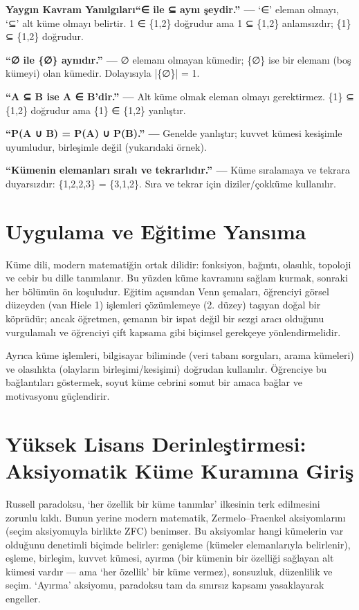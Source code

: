 \begin{tcolorbox}[bookbox,colback=cMis]\textbf{\textsf{\textcolor{cAcc}{Yaygın Kavram Yanılgıları}}}\quad \textbf{“∈ ile ⊆ aynı şeydir.” — }‘∈’ eleman olmayı, ‘⊆’ alt küme olmayı belirtir. 1 ∈ \{1,2\} doğrudur ama 1 ⊆ \{1,2\} anlamsızdır; \{1\} ⊆ \{1,2\} doğrudur.\par\medskip{}\textbf{“∅ ile \{∅\} aynıdır.” — }∅ elemanı olmayan kümedir; \{∅\} ise bir elemanı (boş kümeyi) olan kümedir. Dolayısıyla |\{∅\}| = 1.\par\medskip{}\textbf{“A ⊆ B ise A ∈ B’dir.” — }Alt küme olmak eleman olmayı gerektirmez. \{1\} ⊆ \{1,2\} doğrudur ama \{1\} ∈ \{1,2\} yanlıştır.\par\medskip{}\textbf{“P(A ∪ B) = P(A) ∪ P(B).” — }Genelde yanlıştır; kuvvet kümesi kesişimle uyumludur, birleşimle değil (yukarıdaki örnek).\par\medskip{}\textbf{“Kümenin elemanları sıralı ve tekrarlıdır.” — }Küme sıralamaya ve tekrara duyarsızdır: \{1,2,2,3\} = \{3,1,2\}. Sıra ve tekrar için diziler/çokküme kullanılır.\end{tcolorbox}

\section{Uygulama ve Eğitime Yansıma}

Küme dili, modern matematiğin ortak dilidir: fonksiyon, bağıntı, olasılık, topoloji ve cebir bu dille tanımlanır. Bu yüzden küme kavramını sağlam kurmak, sonraki her bölümün ön koşuludur. Eğitim açısından Venn şemaları, öğrenciyi görsel düzeyden (van Hiele 1) işlemleri çözümlemeye (2. düzey) taşıyan doğal bir köprüdür; ancak öğretmen, şemanın bir ispat değil bir sezgi aracı olduğunu vurgulamalı ve öğrenciyi çift kapsama gibi biçimsel gerekçeye yönlendirmelidir.

Ayrıca küme işlemleri, bilgisayar biliminde (veri tabanı sorguları, arama kümeleri) ve olasılıkta (olayların birleşimi/kesişimi) doğrudan kullanılır. Öğrenciye bu bağlantıları göstermek, soyut küme cebrini somut bir amaca bağlar ve motivasyonu güçlendirir.

\section{Yüksek Lisans Derinleştirmesi: Aksiyomatik Küme Kuramına Giriş}

Russell paradoksu, ‘her özellik bir küme tanımlar’ ilkesinin terk edilmesini zorunlu kıldı. Bunun yerine modern matematik, Zermelo–Fraenkel aksiyomlarını (seçim aksiyomuyla birlikte ZFC) benimser. Bu aksiyomlar hangi kümelerin var olduğunu denetimli biçimde belirler: genişleme (kümeler elemanlarıyla belirlenir), eşleme, birleşim, kuvvet kümesi, ayırma (bir kümenin bir özelliği sağlayan alt kümesi vardır — ama ‘her özellik’ bir küme vermez), sonsuzluk, düzenlilik ve seçim. ‘Ayırma’ aksiyomu, paradoksu tam da sınırsız kapsamı yasaklayarak engeller.

